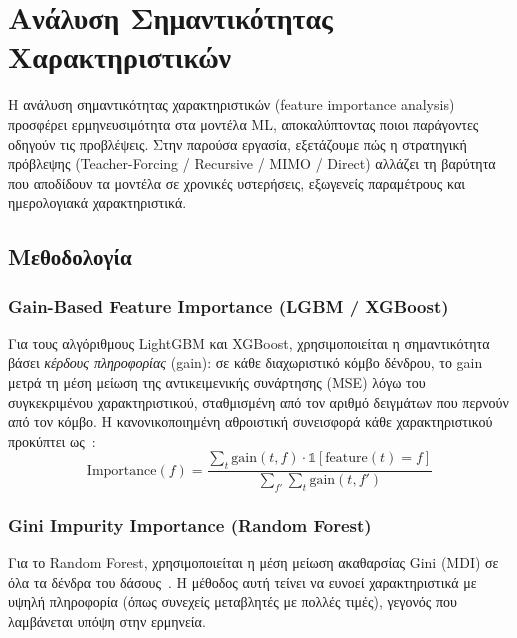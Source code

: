 \section{Ανάλυση Σημαντικότητας Χαρακτηριστικών}
\label{ch:fi}

Η ανάλυση σημαντικότητας χαρακτηριστικών (feature importance analysis) προσφέρει
ερμηνευσιμότητα στα μοντέλα ML, αποκαλύπτοντας ποιοι παράγοντες οδηγούν τις
προβλέψεις. Στην παρούσα εργασία, εξετάζουμε πώς η στρατηγική πρόβλεψης
(Teacher-Forcing / Recursive / MIMO / Direct) αλλάζει τη βαρύτητα που αποδίδουν τα
μοντέλα σε χρονικές υστερήσεις, εξωγενείς παραμέτρους και ημερολογιακά
χαρακτηριστικά.

\subsection{Μεθοδολογία}
\label{sec:fi_methodology}

\subsubsection*{Gain-Based Feature Importance (LGBM / XGBoost)}

Για τους αλγόριθμους LightGBM και XGBoost, χρησιμοποιείται η σημαντικότητα
βάσει \textit{κέρδους πληροφορίας} (gain): σε κάθε διαχωριστικό κόμβο δένδρου,
το gain μετρά τη μέση μείωση της αντικειμενικής συνάρτησης (MSE) λόγω του
συγκεκριμένου χαρακτηριστικού, σταθμισμένη από τον αριθμό δειγμάτων που
περνούν από τον κόμβο. Η κανονικοποιημένη αθροιστική συνεισφορά κάθε
χαρακτηριστικού προκύπτει ως~\cite{ke2017lgbm}:
\begin{equation}
    \text{Importance}(f) = \frac{\sum_{t} \text{gain}(t,f) \cdot \mathbb{1}[\text{feature}(t)=f]}
    {\sum_{f'} \sum_{t} \text{gain}(t,f')}
\end{equation}

\subsubsection*{Gini Impurity Importance (Random Forest)}

Για το Random Forest, χρησιμοποιείται η μέση μείωση ακαθαρσίας Gini (MDI) σε
όλα τα δένδρα του δάσους~\cite{breiman2001rf}. Η μέθοδος αυτή τείνει να
ευνοεί χαρακτηριστικά με υψηλή πληροφορία (όπως συνεχείς μεταβλητές με πολλές
τιμές), γεγονός που λαμβάνεται υπόψη στην ερμηνεία.

